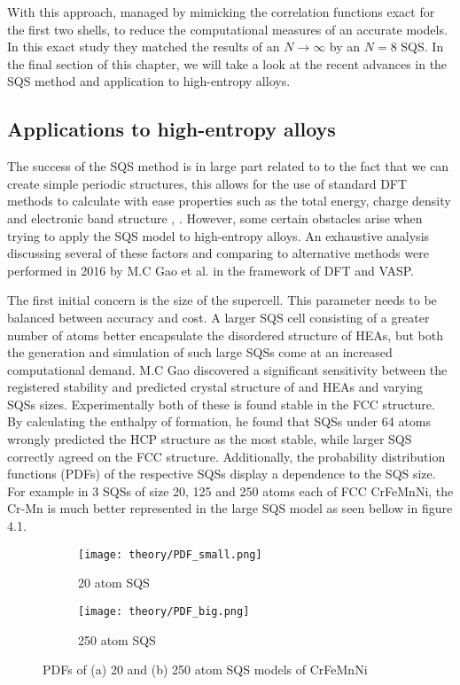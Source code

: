 With this approach, \cite{sqsfull} managed by mimicking the correlation functions exact for the first two shells, to reduce the computational measures of an accurate models. In this exact study they matched the results of an $N \rightarrow \infty$ by an $N=8$ SQS. In the final section of this chapter, we will take a look at the recent advances in the SQS method and application to high-entropy alloys. 

\subsection{Applications to high-entropy alloys}
The success of the SQS method is in large part related to to the fact that we can create simple periodic structures, this allows for the use of standard DFT methods to calculate with ease properties such as the total energy, charge density and electronic band structure \cite{sqs_dos}, \cite{sqs_bg}. However, some certain obstacles arise when trying to apply the SQS model to high-entropy alloys. An exhaustive analysis discussing several of these factors and comparing to alternative methods were performed in 2016 by M.C Gao et al. \cite{hea2016_ch10}  in the framework of DFT and VASP.

The first initial concern is the size of the supercell. This parameter  needs to be balanced between accuracy and cost. A larger SQS cell consisting of a greater number of atoms better encapsulate the disordered structure of HEAs, but both the generation and simulation of such large SQSs come at an increased computational demand.  M.C Gao discovered a significant sensitivity between the registered stability and predicted crystal structure of  and  HEAs and varying SQSs sizes. Experimentally both of these is found stable in the FCC structure. By calculating the enthalpy of formation, he found that SQSs under 64 atoms wrongly predicted the HCP structure as the most stable, while larger SQS correctly agreed on the FCC structure. Additionally, the probability distribution functions (PDFs) of the respective SQSs display a dependence to the SQS size. For example in 3 SQSs of size 20, 125 and 250 atoms each of FCC CrFeMnNi, the Cr-Mn is much better represented in the large SQS model as seen bellow in figure 4.1.

\begin{figure}[H]
\begin{subfigure}{.5\textwidth}
\texttt{[image: theory/PDF\_small.png]}
\caption{20 atom SQS}	
\end{subfigure}
\begin{subfigure}{.5\textwidth}
\texttt{[image: theory/PDF\_big.png]}
\caption{250 atom SQS}
\end{subfigure}
\caption{PDFs of (a) 20 and (b) 250 atom SQS models of CrFeMnNi \cite{hea2016_ch10}}
\end{figure}
     
